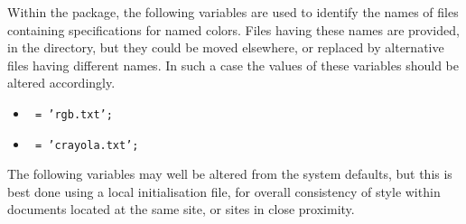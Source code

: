 \bigskip\noindent
Within the  package, the following variables are used to
identify the names of files containing specifications for named colors.
Files having these names are provided, in the 
directory, but they could be moved elsewhere, 
or replaced by alternative files having different names.
In such a case the values of these variables should be altered accordingly.
%
\begin{itemize}
\item []\texttt{ = 'rgb.txt';}
\item []\texttt{ = 'crayola.txt';}
\end{itemize}

\bigskip\noindent
The following variables may well be altered from the system defaults,
but this is best done using a local  initialisation file,
for overall consistency of style within documents located at the same site,
or sites in close proximity.

